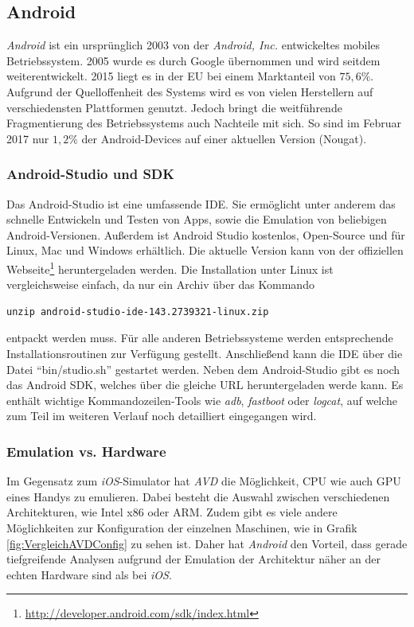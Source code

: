 		\subsection{Android}
			\textit{Android} ist ein ursprünglich 2003 von der \textit{Android, Inc.} entwickeltes mobiles Betriebssystem. 2005 wurde es durch Google übernommen und wird seitdem weiterentwickelt. 2015 liegt es in der EU bei einem Marktanteil von $75,6\%$\cite{KatarWorldpanelMobBetrSys}. Aufgrund der Quelloffenheit des Systems wird es von vielen Herstellern auf verschiedensten Plattformen genutzt. Jedoch bringt die weitführende Fragmentierung des Betriebssystems auch Nachteile mit sich. So sind im Februar 2017 nur $1,2 \%$ der Android-Devices auf einer aktuellen Version (Nougat).\cite{StatistaAndroidVersionen}\cite{Drake2014}
			
			\subsubsection{Android-Studio und SDK}
			Das Android-Studio ist eine umfassende IDE. Sie ermöglicht unter anderem das schnelle Entwickeln und Testen von Apps, sowie die Emulation von beliebigen Android-Versionen. Außerdem ist Android Studio kostenlos, Open-Source und für Linux, Mac und Windows erhältlich. Die aktuelle Version kann von der offiziellen Webseite\footnote{\url{http://developer.android.com/sdk/index.html}} heruntergeladen werden. Die Installation unter Linux ist vergleichsweise einfach, da nur ein Archiv über das Kommando 
\begin{lstlisting}
unzip android-studio-ide-143.2739321-linux.zip
\end{lstlisting}
entpackt werden muss. Für alle anderen Betriebssysteme werden entsprechende Installationsroutinen zur Verfügung gestellt. Anschließend kann die IDE über die Datei "`bin/studio.sh"' gestartet werden. Neben dem Android-Studio gibt es noch das Android SDK, welches über die gleiche URL heruntergeladen werde kann. Es enthält wichtige Kommandozeilen-Tools wie \textit{adb}, \textit{fastboot} oder \textit{logcat}, auf welche zum Teil im weiteren Verlauf noch detailliert eingegangen wird.

			
			\subsubsection{Emulation vs. Hardware}
			Im Gegensatz zum \textit{iOS}-Simulator hat \textit{AVD} die Möglichkeit, CPU wie auch GPU eines Handys zu emulieren. Dabei besteht die Auswahl zwischen verschiedenen Architekturen, wie Intel x86 oder ARM. Zudem gibt es viele andere Möglichkeiten zur Konfiguration der einzelnen Maschinen, wie in Grafik \ref{fig:VergleichAVDConfig} zu sehen ist. Daher hat \textit{Android} den Vorteil, dass gerade tiefgreifende Analysen aufgrund der Emulation der Architektur näher an der echten Hardware sind als bei \textit{iOS}.\cite{Drake2014}
			
